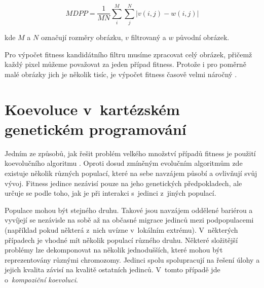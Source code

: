 \begin{equation}
    \label{eqMDPP}
    \mathit{MDPP} = \frac{1}{MN} \sum\limits_i^M \sum\limits_j^N \left| v\left( i, j \right) - w\left( i, j \right) \right|
\end{equation}

\noindent{}kde $M$ a $N$ označují rozměry obrázku, $v$ filtrovaný a $w$ původní obrázek.

Pro výpočet fitness kandidátního filtru musíme zpracovat celý obrázek, přičemž každý pixel můžeme považovat za jeden případ fitness. Protože i pro poměrně malé obrázky jich je několik tisíc, je výpočet fitness časově velmi náročný \cite{Modra, ZelenaIF}.

\section{Koevoluce v~kartézském genetickém programování}
\label{secCoev}

Jedním ze způsobů, jak řešit problém velkého množství případů fitness je použití koevolučního algoritmu \cite{HandbookCoev}. Oproti dosud zmíněným evolučním algoritmům zde existuje několik různých populací, které na sebe navzájem působí a ovlivňují svůj vývoj. Fitness jedince nezávisí pouze na jeho genetických předpokladech, ale určuje se podle toho, jak  je při interakci s~jedinci z~jiných populací.

Populace mohou být stejného druhu. Takové jsou navzájem oddělené bariérou a vyvíjejí se nezávisle na sobě až na občasné migrace jedinců mezi podpopulacemi (například pokud některá z~nich uvízne v~lokálním extrému). V~některých případech je vhodné mít několik populací různého druhu. Některé složitější problémy lze dekomponovat na několik jednodušších, které mohou být reprezentovány různými chromozomy. Jedinci spolu spolupracují na řešení úlohy a jejich kvalita závisí na kvalitě ostatních jedinců. V~tomto případě jde o~\emph{kompoziční koevoluci}.

